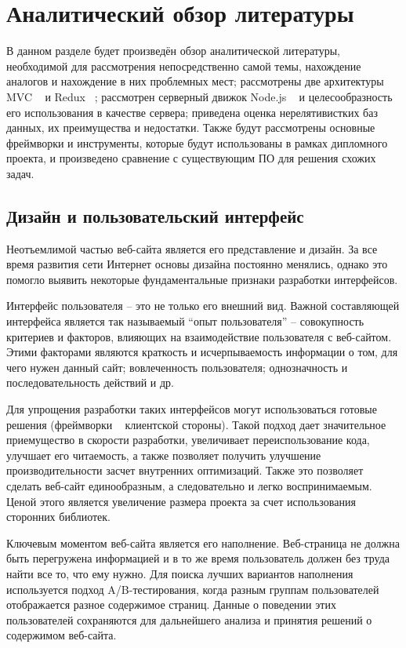 \section{Аналитический обзор литературы}
\label{sec:domain}

В данном разделе будет произведён обзор аналитической литературы, необходимой для рассмотрения непосредственно самой темы, нахождение аналогов и нахождение в них проблемных мест; рассмотрены две архитектуры MVC ~\cite{mvc} и Redux ~\cite{redux}; рассмотрен серверный движок Node.js ~\cite{node_js} и целесообразность его использования в качестве сервера; приведена оценка нерелятивистких баз данных, их преимущества и недостатки.
Также будут рассмотрены основные фреймворки и инструменты, которые будут использованы в рамках дипломного проекта, и произведено сравнение с существующим ПО для решения схожих задач.

\subsection{Дизайн и пользовательский интерфейс}
\label{sub:domain:bayes_net}
Неотъемлимой частью веб-сайта является его представление и дизайн. За все время развития сети Интернет основы дизайна постоянно менялись, однако это помогло выявить некоторые фундаментальные признаки разработки интерфейсов.

Интерфейс пользователя – это не только его внешний вид. Важной составляющей интерфейса является так называемый “опыт пользователя” – совокупность критериев и факторов, влияющих на взаимодействие пользователя с веб-сайтом. Этими факторами являются краткость и исчерпываемость информации о том, для чего нужен данный сайт; вовлеченность пользователя; однозначность и последовательность действий и др.

Для упрощения разработки таких интерфейсов могут использоваться готовые решения (фреймворки ~\cite{framework} клиентской стороны). Такой подход дает значительное приемущество в скорости разработки, увеличивает переиспользование кода, улучшает его читаемость, а также позволяет получить улучшение производительности засчет внутренних оптимизаций. Также это позволяет сделать веб-сайт единообразным, а следовательно и легко воспринимаемым. Ценой этого является увеличение размера проекта за счет использования сторонних библиотек.

Ключевым моментом веб-сайта является его наполнение. Веб-страница не должна быть перегружена информацией и в то же время пользователь должен без труда найти все то, что ему нужно. Для поиска лучших вариантов наполнения используется подход A/B-тестирования, когда разным группам пользователей отображается разное содержимое страниц. Данные о поведении этих пользователей сохраняются для дальнейшего анализа и принятия решений о содержимом веб-сайта.

